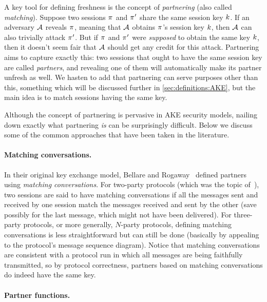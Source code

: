 A key tool for defining freshness is the concept of \emph{partnering}
(also called \emph{matching}).
Suppose two sessions $\oracle$ and $\oracle'$ share the same session key $k$.
If an adversary $\mathcal{A}$ reveals $\oracle$,
meaning that $\mathcal{A}$ obtains $\oracle$'s session key $k$,
then $\mathcal{A}$ can also trivially attack $\oracle'$.
But if $\oracle$ and $\oracle'$ were \emph{supposed} to obtain the same key $k$,
then it doesn't seem fair that $\mathcal{A}$ should get any credit for this attack.
Partnering aims to capture exactly this:
two sessions that ought to have the same session key are called \emph{partners},
and revealing one of them will automatically make its partner unfresh as well.
We hasten to add that partnering can serve purposes other than this,
something which will be discussed further in \cref{sec:definitions:AKE},
but the main idea is to match sessions having the same key.

Although the concept of partnering is pervasive in AKE security models,
nailing down exactly what partnering \emph{is} can be surprisingly difficult.
Below we discuss some of the common approaches that have been taken in the literature.

\paragraph{Matching conversations.}
In their original key exchange model,
Bellare and Rogaway~\cite{C:BelRog93} defined partners using \emph{matching conversations}.
For two-party protocols
(which was the topic of~\cite{C:BelRog93}),
two sessions are said to have matching conversations if all the messages sent and received by one session match the messages received and sent by the other
(save possibly for the last message, which might not have been delivered).
For three-party protocols,
or more generally, $N$-party protocols,
defining matching conversations is less straightforward but can still be done
(basically by appealing to the protocol's message sequence diagram).
Notice that matching conversations are consistent with a protocol run in which all messages are being faithfully transmitted,
so by protocol correctness,
partners based on matching conversations do indeed have the same key.




\paragraph{Partner functions.}

